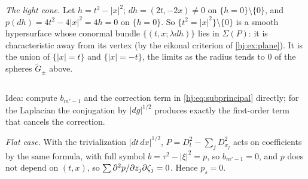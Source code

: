 \emph{The light cone.} Let $h=t^2-|x|^2$; $dh=(2t,-2x)\ne0$ on $\{h=0\}\setminus\{0\}$, and
$p(dh)=4t^2-4|x|^2=4h=0$ on $\{h=0\}$. So $\{t^2=|x|^2\}\setminus\{0\}$ is a smooth
hypersurface whose conormal bundle $\{(t,x;\lambda dh)\}$ lies in $\Sigma(P)$: it is
characteristic away from its vertex (by the eikonal criterion of \cref{hj:ex:plane}). It is the
union of $\{|x|=t\}$ and $\{|x|=-t\}$, the limits as the radius tends to $0$ of the spheres
$\tilde G_\pm$ above.

\subsection*{}
Idea: compute $b_{m'-1}$ and the correction term in \eqref{hj:eq:subprincipal} directly; for
the Laplacian the conjugation by $|dg|^{1/2}$ produces exactly the first-order term that
cancels the correction.

\emph{Flat case.} With the trivialization $|dt\,dx|^{1/2}$, $P=D_t^2-\sum_jD_{x_j}^2$ acts on
coefficients by the same formula, with full symbol $b=\tau^2-|\xi|^2=p$, so $b_{m'-1}=0$, and
$p$ does not depend on $(t,x)$, so $\sum\partial^2p/\partial z_j\partial\zeta_j=0$. Hence $p_s=0$.

